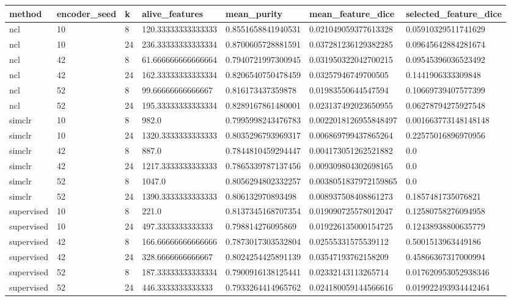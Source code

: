 \begin{tabular}{lllllll}
\toprule
method & encoder\_seed & k & alive\_features & mean\_purity & mean\_feature\_dice & selected\_feature\_dice \\
\midrule
ncl & 10 & 8 & 120.33333333333333 & 0.8551658841940531 & 0.021049059377613328 & 0.05910329511741629 \\
ncl & 10 & 24 & 236.33333333333334 & 0.8700605728881591 & 0.037281236129382285 & 0.09645642884281674 \\
ncl & 42 & 8 & 61.666666666666664 & 0.7940721997300945 & 0.031950322042700215 & 0.09545396036523492 \\
ncl & 42 & 24 & 162.33333333333334 & 0.8206540750478459 & 0.03257946749700505 & 0.1441906333309848 \\
ncl & 52 & 8 & 99.66666666666667 & 0.816173437359878 & 0.01983550644547594 & 0.10669739407577399 \\
ncl & 52 & 24 & 195.33333333333334 & 0.8289167861480001 & 0.023137492023650955 & 0.06278794275927548 \\
simclr & 10 & 8 & 982.0 & 0.7995998243476783 & 0.0022018126955848497 & 0.001663773148148148 \\
simclr & 10 & 24 & 1320.3333333333333 & 0.8035296793969317 & 0.006869799437865264 & 0.22575016896970956 \\
simclr & 42 & 8 & 887.0 & 0.7844810459294447 & 0.004173051262521882 & 0.0 \\
simclr & 42 & 24 & 1217.3333333333333 & 0.7865339787137456 & 0.009309804302698165 & 0.0 \\
simclr & 52 & 8 & 1047.0 & 0.8056294802332257 & 0.0038051837972159865 & 0.0 \\
simclr & 52 & 24 & 1390.3333333333333 & 0.806132970893498 & 0.008937508408861273 & 0.1857481735076821 \\
supervised & 10 & 8 & 221.0 & 0.8137345168707354 & 0.019090725578012047 & 0.12580758276094958 \\
supervised & 10 & 24 & 497.3333333333333 & 0.798814276095869 & 0.019226135000154725 & 0.12438938800635779 \\
supervised & 42 & 8 & 166.66666666666666 & 0.7873017303532804 & 0.02555331575539112 & 0.5001513963449186 \\
supervised & 42 & 24 & 328.6666666666667 & 0.8024254425891139 & 0.03547193762158209 & 0.45866367317000994 \\
supervised & 52 & 8 & 187.33333333333334 & 0.7900916138125441 & 0.02332143113265714 & 0.017620953052938346 \\
supervised & 52 & 24 & 446.3333333333333 & 0.7933264414965762 & 0.024180059144566616 & 0.019922493934442464 \\
\bottomrule
\end{tabular}
